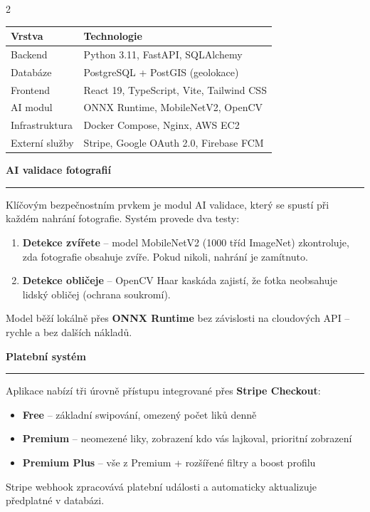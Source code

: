 \documentclass[final]{beamer}
\newcommand{\Heading}[1]{%
  \vspace{1em}%
  {\color{jecnaBlue}\bfseries\fontsize{56}{70}\selectfont #1}\par
  \noindent\textcolor{accentOrange}{\rule{\linewidth}{3pt}}\par
  \vspace{0.5em}%
}
\begin{document}
\begin{frame}[t]
\begin{multicols}{2}
\vspace{0.8em}
{\fontsize{30}{40}\selectfont
\begin{tabularx}{\linewidth}{@{}lX@{}}
\toprule
\textbf{Vrstva} & \textbf{Technologie} \\
\midrule
Backend & Python 3.11, FastAPI, SQLAlchemy \\
Databáze & PostgreSQL + PostGIS (geolokace) \\
Frontend & React 19, TypeScript, Vite, Tailwind CSS \\
AI modul & ONNX Runtime, MobileNetV2, OpenCV \\
Infrastruktura & Docker Compose, Nginx, AWS EC2 \\
Externí služby & Stripe, Google OAuth 2.0, Firebase FCM \\
\bottomrule
\end{tabularx}
}

\Heading{AI validace fotografií}

{\fontsize{32}{42}\selectfont
Klíčovým bezpečnostním prvkem je modul AI validace, který se spustí při každém nahrání fotografie. Systém provede dva testy:

\begin{enumerate}
  \item \textbf{Detekce zvířete} – model MobileNetV2 (1000 tříd ImageNet) zkontroluje, zda fotografie obsahuje zvíře. Pokud nikoli, nahrání je zamítnuto.
  \item \textbf{Detekce obličeje} – OpenCV Haar kaskáda zajistí, že fotka neobsahuje lidský obličej (ochrana soukromí).
\end{enumerate}

Model běží lokálně přes \textbf{ONNX Runtime} bez závislosti na cloudových API – rychle a bez dalších nákladů.
}

\Heading{Platební systém}

{\fontsize{32}{42}\selectfont
Aplikace nabízí tři úrovně přístupu integrované přes \textbf{Stripe Checkout}:

\begin{itemize}
  \item \textbf{Free} – základní swipování, omezený počet liků denně
  \item \textbf{Premium} – neomezené liky, zobrazení kdo vás lajkoval, prioritní zobrazení
  \item \textbf{Premium Plus} – vše z Premium + rozšířené filtry a boost profilu
\end{itemize}

Stripe webhook zpracovává platební události a automaticky aktualizuje předplatné v databázi.
}


\end{multicols}
\end{frame}
\end{document}

